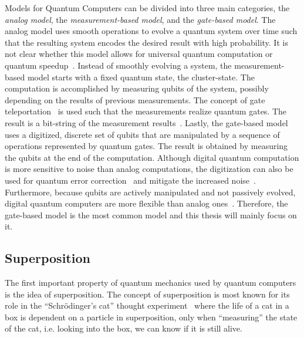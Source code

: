 Models for Quantum Computers can be divided into three main categories, the \emph{analog model}, the \emph{measurement-based model}, and the \emph{gate-based model}. The analog model uses smooth operations to evolve a quantum system over time such that the resulting system encodes the desired result with high probability. It is not clear whether this model allows for universal quantum computation or quantum speedup~\cite{DiCh20}. Instead of smoothly evolving a system, the measurement-based model starts with a fixed quantum state, the cluster-state. The computation is accomplished by measuring qubits of the system, possibly depending on the results of previous measurements. The concept of gate teleportation~ is used such that the measurements realize quantum gates. The result is a bit-string of the measurement results~\cite{DiCh20, Niel06}. Lastly, the gate-based model uses a digitized, discrete set of qubits that are manipulated by a sequence of operations represented by quantum gates. The result is obtained by measuring the qubits at the end of the computation. Although digital quantum computation is more sensitive to noise than analog computations, the digitization can also be used for quantum error correction~\cite{DMN13} and mitigate the increased noise~\cite{DiCh20}. Furthermore, because qubits are actively manipulated and not passively evolved, digital quantum computers are more flexible than analog ones~\cite{RDB*22}. Therefore, the gate-based model is the most common model and this thesis will mainly focus on it. 

\subsection{Superposition} 
The first important property of quantum mechanics used by quantum computers is the idea of superposition. The concept of superposition is most known for its role in the ``Schrödinger's cat'' thought experiment~\cite{Wine13} where the life of a cat in a box is dependent on a particle in superposition, only when ``measuring'' the state of the cat, i.e. looking into the box, we can know if it is still alive. 

